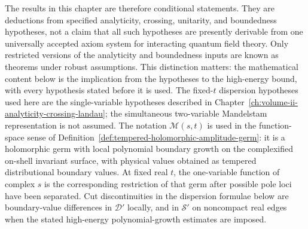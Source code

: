 The results in this chapter are therefore conditional statements.  They are
deductions from specified analyticity, crossing, unitarity, and boundedness
hypotheses, not a claim that all such hypotheses are presently derivable from
one universally accepted axiom system for interacting quantum field theory.
Only restricted versions of the analyticity and boundedness inputs are known
as theorems under robust assumptions.  This distinction matters: the
mathematical content below is the implication from the hypotheses to the
high-energy bound, with every hypothesis stated before it is used.
The fixed-\(t\) dispersion hypotheses used here are the single-variable
hypotheses described in Chapter~\ref{ch:volume-ii-analyticity-crossing-landau};
the simultaneous two-variable Mandelstam representation is not assumed.
The notation \(\mathcal M(s,t)\) is used in the function-space sense of
Definition~\ref{def:tempered-holomorphic-amplitude-germ}: it is a holomorphic
germ with local polynomial boundary growth on the complexified on-shell
invariant surface, with physical values obtained as tempered distributional
boundary values.  At fixed real \(t\), the one-variable function of complex
\(s\) is the corresponding restriction of that germ after possible pole loci
have been separated.  Cut discontinuities in the dispersion formulae below are
boundary-value differences in \(\mathcal D'\) locally, and in \(\mathcal S'\)
on noncompact real edges when the stated high-energy polynomial-growth
estimates are imposed.

